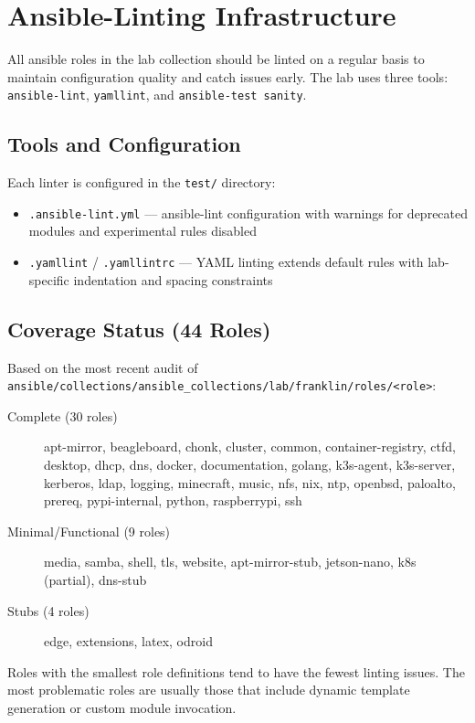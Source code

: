 \section{Ansible-Linting Infrastructure}

All ansible roles in the lab collection should be linted on a regular basis to maintain configuration quality and catch issues early. The lab uses three tools: \texttt{ansible-lint}, \texttt{yamllint}, and \texttt{ansible-test sanity}.

\subsection{Tools and Configuration}

Each linter is configured in the \texttt{test/} directory:
\begin{itemize}
    \item \texttt{.ansible-lint.yml} — ansible-lint configuration with warnings for deprecated modules and experimental rules disabled
    \item \texttt{.yamllint} / \texttt{.yamllintrc} — YAML linting extends default rules with lab-specific indentation and spacing constraints
\end{itemize}

\subsection{Coverage Status (44 Roles)}

Based on the most recent audit of \texttt{ansible/collections/ansible\_collections/lab/franklin/roles/\textless role\textgreater}:

\begin{description}
    \item[Complete (30 roles)] apt-mirror, beagleboard, chonk, cluster, common, container-registry, ctfd, desktop, dhcp, dns, docker, documentation, golang, k3s-agent, k3s-server, kerberos, ldap, logging, minecraft, music, nfs, nix, ntp, openbsd, paloalto, prereq, pypi-internal, python, raspberrypi, ssh
    \item[Minimal/Functional (9 roles)] media, samba, shell, tls, website, apt-mirror-stub, jetson-nano, k8s (partial), dns-stub
    \item[Stubs (4 roles)] edge, extensions, latex, odroid
\end{description}

Roles with the smallest role definitions tend to have the fewest linting issues. The most problematic roles are usually those that include dynamic template generation or custom module invocation.

